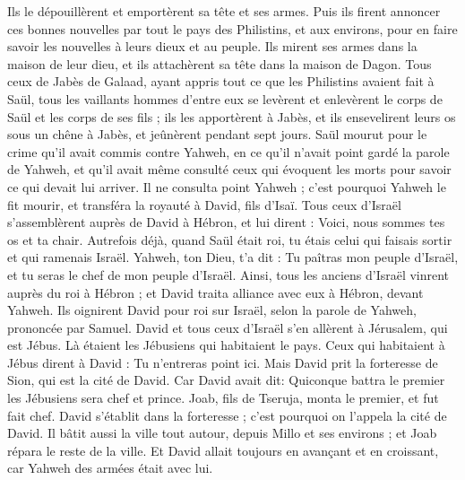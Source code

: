 \begin{multicols}{2}
Ils le dépouillèrent et emportèrent sa tête et ses armes. Puis ils firent annoncer ces bonnes nouvelles par tout le pays des Philistins, et aux environs, pour en faire savoir les nouvelles à leurs dieux et au peuple.
Ils mirent ses armes dans la maison de leur dieu, et ils attachèrent sa tête dans la maison de Dagon.
Tous ceux de Jabès de Galaad, ayant appris tout ce que les Philistins avaient fait à Saül,
tous les vaillants hommes d'entre eux se levèrent et enlevèrent le corps de Saül et les corps de ses fils ; ils les apportèrent à Jabès, et ils ensevelirent leurs os sous un chêne à Jabès, et jeûnèrent pendant sept jours.
Saül mourut pour le crime qu'il avait commis contre Yahweh, en ce qu'il n'avait point gardé la parole de Yahweh, et qu'il avait même consulté ceux qui évoquent les morts pour savoir ce qui devait lui arriver.
Il ne consulta point Yahweh ; c'est pourquoi Yahweh le fit mourir, et transféra la royauté à David, fils d'Isaï.
\VerseOne{}Tous ceux d'Israël s'assemblèrent auprès de David à Hébron, et lui dirent : Voici, nous sommes tes os et ta chair.
Autrefois déjà, quand Saül était roi, tu étais celui qui faisais sortir et qui ramenais Israël. Yahweh, ton Dieu, t'a dit : Tu paîtras mon peuple d'Israël, et tu seras le chef de mon peuple d'Israël.
Ainsi, tous les anciens d'Israël vinrent auprès du roi à Hébron ; et David traita alliance avec eux à Hébron, devant Yahweh. Ils oignirent David pour roi sur Israël, selon la parole de Yahweh, prononcée par Samuel.
David et tous ceux d'Israël s'en allèrent à Jérusalem, qui est Jébus. Là étaient les Jébusiens qui habitaient le pays.
Ceux qui habitaient à Jébus dirent à David : Tu n'entreras point ici. Mais David prit la forteresse de Sion, qui est la cité de David.
Car David avait dit: Quiconque battra le premier les Jébusiens sera chef et prince. Joab, fils de Tseruja, monta le premier, et fut fait chef.
David s'établit dans la forteresse ; c'est pourquoi on l'appela la cité de David.
Il bâtit aussi la ville tout autour, depuis Millo et ses environs ; et Joab répara le reste de la ville.
Et David allait toujours en avançant et en croissant, car Yahweh des armées était avec lui.

\end{multicols}
